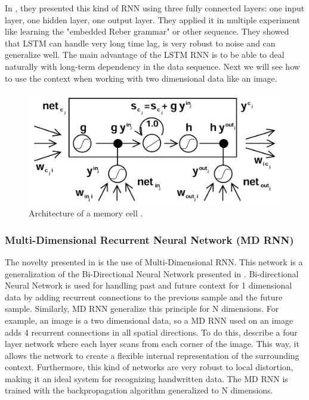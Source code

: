 \documentclass[11pt]{sdm}
\begin{document}
In \cite{hochreiter_long_1997}, they presented this kind of RNN using three fully connected layers: one input layer, one hidden layer, one output layer.
They applied it in multiple experiment like learning the "embedded Reber grammar" or other sequence.
They showed that LSTM can handle very long time lag, is very robust to noise and can generalize well.
The main advantage of the LSTM RNN is to be able to deal naturally with long-term dependency in the data sequence.
Next we will see how to use the context when working with two dimensional data like an image.
\begin{figure}[btp]
  \centering
  \includegraphics[scale=0.8]{img/lstm_unit}
  \caption{\label{lstm_unit} Architecture of a memory cell \cite{hochreiter_long_1997}. }
\end{figure}

\subsubsection{Multi-Dimensional Recurrent Neural Network (MD RNN)}

The novelty presented in \cite{graves_offline_2009} is the use of Multi-Dimensional RNN.
This network is a generalization of the Bi-Directional Neural Network presented in \cite{schuster_bidirectional_1997}.
Bi-directional Neural Network is used for handling past and future context for 1 dimensional data by adding recurrent connections to the previous sample and the future sample.
Similarly, MD RNN generalize this principle for N dimensions.
For example, an image is a two dimensional data, so a MD RNN used on an image adds 4 recurrent connections in all spatial directions.
To do this, \cite{graves_offline_2009} describe a four layer network where each layer scans from each corner of the image.
This way, it allows the network to create a flexible internal representation of the surrounding context.
Furthermore, this kind of networks are very robust to local distortion, making it an ideal system for recognizing handwritten data.
The MD RNN is trained with the backpropagation algorithm generalized to N dimensions.
\end{document}
